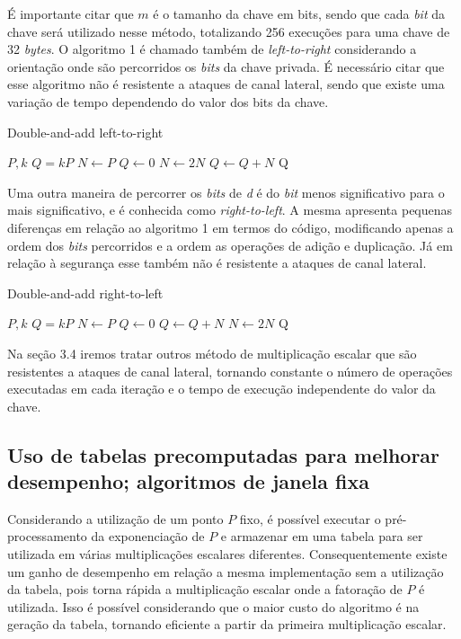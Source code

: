 É importante citar que $m$ é o tamanho da chave em bits, sendo que cada \textit{bit} da chave será utilizado nesse método, totalizando 256 execuções para uma chave de 32 \textit{bytes}. O algoritmo 1 é chamado também de \textit{left-to-right} considerando a orientação onde são percorridos os \textit{bits} da chave privada. É necessário citar que esse algoritmo não é resistente a ataques de canal lateral, sendo que existe uma variação de tempo dependendo do valor dos bits da chave.

\begin{algorithm}[H]
\caption{Double-and-add left-to-right}
\begin{algorithmic} 
    \REQUIRE $P, k$
    \ENSURE $Q = kP$
    \STATE $N \leftarrow P$
    \STATE $Q \leftarrow 0$
        \STATE $N \leftarrow 2N$
            \STATE $Q \leftarrow Q+N$
        \ENDIF
    \ENDFOR
    \RETURN Q
    \end{algorithmic}
\end{algorithm}

Uma outra maneira de percorrer os \textit{bits} de \textit{d} é do \textit{bit} menos significativo para o  mais significativo, e é conhecida como \textit{right-to-left}. A mesma apresenta pequenas diferenças em relação ao algoritmo 1 em termos do código, modificando apenas a ordem dos \textit{bits} percorridos e a ordem as operações de adição e duplicação. Já em relação à segurança esse também não é resistente a ataques de canal lateral.

\begin{algorithm}[H]
\caption{Double-and-add right-to-left}
\begin{algorithmic} 
    \REQUIRE $P, k$
    \ENSURE $Q = kP$
    \STATE $N \leftarrow P$
    \STATE $Q \leftarrow 0$
            \STATE $Q \leftarrow Q + N$
        \ENDIF
        \STATE $N \leftarrow 2N$
    \ENDFOR
    \RETURN Q
    \end{algorithmic}
\end{algorithm}

Na seção 3.4 iremos tratar outros método de multiplicação escalar que são resistentes a ataques de canal lateral, tornando constante o número de operações executadas em cada iteração e o tempo de execução independente do valor da chave.

\subsection{Uso de tabelas precomputadas para melhorar desempenho; algoritmos de janela fixa}
Considerando a utilização de um ponto $P$ fixo, é possível executar o pré-processamento da exponenciação de $P$ e armazenar em uma tabela para ser utilizada em várias multiplicações escalares diferentes. Consequentemente existe um ganho de desempenho em relação a mesma implementação sem a utilização da tabela, pois torna rápida a multiplicação escalar onde a fatoração de $P$ é utilizada. Isso é possível considerando que o maior custo do algoritmo é na geração da tabela, tornando eficiente a partir da primeira multiplicação escalar.

